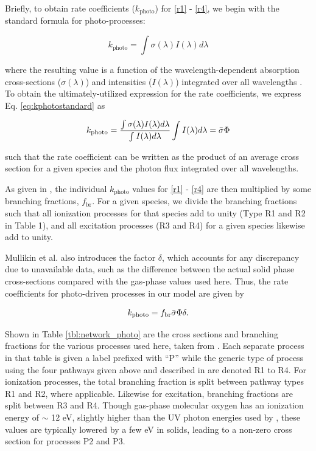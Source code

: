 \documentclass[journal=aesccq,manuscript=article,layout=twocolumn]{achemso}
\begin{document}
Briefly, to obtain rate coefficients ($k_\mathrm{photo}$) for \eqref{r1} - \eqref{r4}, we begin with the standard formula for photo-processes:

\begin{equation}
    k_\mathrm{photo} = \int \sigma(\lambda)I(\lambda) d\lambda
    \label{eq:kphotostandard}
\end{equation}

\noindent  
where the resulting value is a function of the wavelength-dependent absorption cross-sections ($\sigma(\lambda)$) and intensities ($I(\lambda)$) integrated over all wavelengths \citep{van_dishoeck_photodissociation_1988}. To obtain the ultimately-utilized expression for the rate coefficients, we express Eq. \eqref{eq:kphotostandard} as

\begin{equation}
    k_\mathrm{photo} = \frac{\int \sigma(\lambda)I(\lambda)d\lambda}{\int I(\lambda)d\lambda} \int I(\lambda)d\lambda = \Bar{\sigma}\Phi
    \label{eq:kmullikin}
\end{equation}

\noindent
such that the rate coefficient can be written as the product of an average cross section for a given species and the photon flux integrated over all wavelengths. 

As given in \citet{mullikin_new_2021}, the individual $k_\mathrm{photo}$ values for \eqref{r1} - \eqref{r4} are then multiplied by some branching fractions, $f_\mathrm{br}$. For a given species, we divide the branching fractions such that all ionization processes for that species add to unity (Type R1 and R2 in Table 1), and all excitation processes (R3 and R4) for a given species likewise add to unity.

Mullikin et al. also introduces the factor $\delta$, which accounts for any discrepancy due to unavailable data, such as the difference between the actual solid phase cross-sections compared with the gas-phase values used here. Thus, the rate coefficients for photo-driven processes in our model are given by

\begin{equation}
    k_\mathrm{photo} = f_\mathrm{br}\Bar{\sigma}\Phi\delta.
\end{equation}

\noindent
Shown in Table \ref{tbl:network_photo} are the cross sections and branching fractions for the various processes used here, taken from \citet{mullikin_new_2021}. Each separate process in that table is given a label prefixed with ``P'' while the generic type of process using the four pathways given above and described in \citet{shingledecker_new_2017} are denoted R1 to R4. For ionization processes, the total branching fraction is split between pathway types R1 and R2, where applicable. Likewise for excitation, branching fractions are split between R3 and R4. Though gas-phase molecular oxygen has an ionization energy of $\sim$ 12 eV, slightly higher than the UV photon energies used by \citet{gerakines_ultraviolet_1996}, these values are typically lowered by a few eV in solids, leading to a non-zero cross section for processes P2 and P3. 
\end{document}
